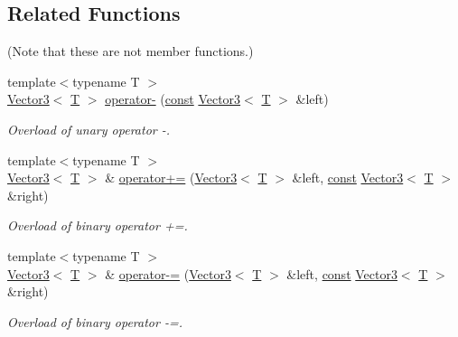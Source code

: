 \subsection*{Related Functions}
(Note that these are not member functions.) \begin{DoxyCompactItemize}
\item 
{\footnotesize template$<$typename T $>$ }\\\hyperlink{classsf_1_1_vector3}{Vector3}$<$ \hyperlink{curses_8priv_8h_a5ef253115820acf7d27f3c5c3b02a0f0}{T} $>$ \hyperlink{classsf_1_1_vector3_a9b75d2fb9b0f2fd9fe33f8f06f9dda75}{operator-\/} (\hyperlink{term__entry_8h_a57bd63ce7f9a353488880e3de6692d5a}{const} \hyperlink{classsf_1_1_vector3}{Vector3}$<$ \hyperlink{curses_8priv_8h_a5ef253115820acf7d27f3c5c3b02a0f0}{T} $>$ \&left)
\begin{DoxyCompactList}\small\item\em Overload of unary operator -\/. \end{DoxyCompactList}\item 
{\footnotesize template$<$typename T $>$ }\\\hyperlink{classsf_1_1_vector3}{Vector3}$<$ \hyperlink{curses_8priv_8h_a5ef253115820acf7d27f3c5c3b02a0f0}{T} $>$ \& \hyperlink{classsf_1_1_vector3_abc28859af163c63318ea2723b81c5ad9}{operator+=} (\hyperlink{classsf_1_1_vector3}{Vector3}$<$ \hyperlink{curses_8priv_8h_a5ef253115820acf7d27f3c5c3b02a0f0}{T} $>$ \&left, \hyperlink{term__entry_8h_a57bd63ce7f9a353488880e3de6692d5a}{const} \hyperlink{classsf_1_1_vector3}{Vector3}$<$ \hyperlink{curses_8priv_8h_a5ef253115820acf7d27f3c5c3b02a0f0}{T} $>$ \&right)
\begin{DoxyCompactList}\small\item\em Overload of binary operator +=. \end{DoxyCompactList}\item 
{\footnotesize template$<$typename T $>$ }\\\hyperlink{classsf_1_1_vector3}{Vector3}$<$ \hyperlink{curses_8priv_8h_a5ef253115820acf7d27f3c5c3b02a0f0}{T} $>$ \& \hyperlink{classsf_1_1_vector3_aa465672d2a4ee5fd354e585cf08d2ab9}{operator-\/=} (\hyperlink{classsf_1_1_vector3}{Vector3}$<$ \hyperlink{curses_8priv_8h_a5ef253115820acf7d27f3c5c3b02a0f0}{T} $>$ \&left, \hyperlink{term__entry_8h_a57bd63ce7f9a353488880e3de6692d5a}{const} \hyperlink{classsf_1_1_vector3}{Vector3}$<$ \hyperlink{curses_8priv_8h_a5ef253115820acf7d27f3c5c3b02a0f0}{T} $>$ \&right)
\begin{DoxyCompactList}\small\item\em Overload of binary operator -\/=. \end{DoxyCompactList}\item 

\end{DoxyCompactItemize}
